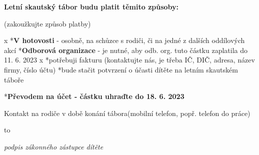 \noindent
\medskip
\parindent=1pt

{\bf Letní skautský tábor budu platit těmito způsoby:}
\parindent=0cm

(zakoužkujte způsob platby)

\begitems \style x
*{\bf V hotovosti} - osobně, na schůzce s rodiči, či na jedné z dalších oddílových akcí
*{\bf Odborová organizace} -  je nutné, aby odb. org. tuto částku zaplatila do 11. 6. 2023
\begitems \style x
*potřebuji fakturu (kontaktujte nás, je třeba IČ, DIČ, adresa, název firmy, číslo účtu)
*bude stačit potvrzení o účasti dítěte na letním skautském táboře
\enditems

*{\bf Převodem na účet - částku uhraďte do 18. 6. 2023}
\enditems

\medskip
Kontakt na rodiče v době konání tábora(mobilní telefon, popř. telefon do práce)
\vskip 2cm

\hbox to 

{\hfill\it\typosize[7/13]podpis zákonného zástupce dítěte}
\bye
